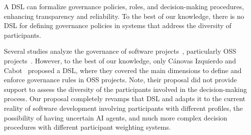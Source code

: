 
A DSL can formalize governance policies, roles, and decision-making procedures, enhancing transparency and reliability.
To the best of our knowledge, there is no DSL for defining governance policies in systems that address the diversity of participants.

Several studies %
analyze the governance of software projects~\cite{DBLP:conf/icse/ChulaniWY08,DBLP:conf/sigsoft/Herbsleb16}, particularly %
OSS projects~\cite{DBLP:journals/ism/PeltJBO21,DBLP:conf/icse/IzquierdoC15,DBLP:conf/ease/KeertipatiLS16}.
However, to the best of our knowledge, only C\'anovas Izquierdo and Cabot~\cite{DBLP:conf/icse/IzquierdoC15} proposed a DSL, where they covered the main dimensions  %
to define and enforce governance rules in OSS projects.
Note, their proposal did not provide support to assess the diversity of the participants involved in the decision-making process.
Our proposal completely revamps that DSL and adapts it to the current reality of software development involving participants with different profiles, the possibility of having uncertain AI agents, and much more complex decision procedures with different participant weighting systems.

